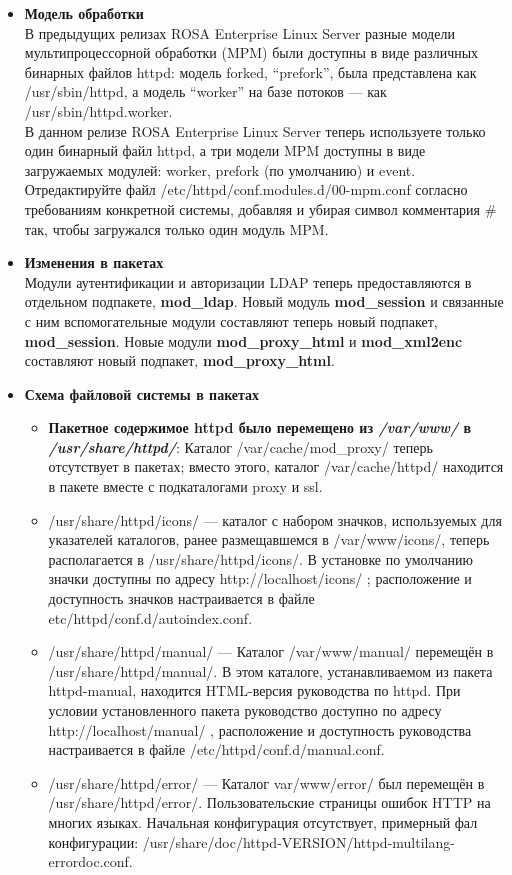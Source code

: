\documentclass[a4paper,10pt,twoside]{article}
\begin{document}
\begin{itemize}
\item \textbf{Модель обработки}\\
В предыдущих релизах ROSA Enterprise Linux Server разные модели мультипроцессорной обработки (MPM) были доступны в виде различных бинарных файлов httpd: модель forked, “prefork”, была представлена как /usr/sbin/httpd, а модель “worker” на базе потоков — как /usr/sbin/httpd.worker.\\
В данном релизе ROSA Enterprise Linux Server теперь используете только один бинарный файл httpd, а три модели MPM доступны в виде загружаемых модулей: worker, prefork (по умолчанию) и event. Отредактируйте файл /etc/httpd/conf.modules.d/00-mpm.conf согласно требованиям конкретной системы, добавляя и убирая символ комментария \# так, чтобы загружался только один модуль MPM.
\item \textbf{Изменения в пакетах}\\
Модули аутентификации и авторизации LDAP теперь предоставляются в отдельном подпакете, \textbf{mod\_ldap}. Новый модуль \textbf{mod\_session} и связанные с ним вспомогательные модули составляют теперь новый подпакет, \textbf{mod\_session}. Новые модули \textbf{mod\_proxy\_html} и \textbf{mod\_xml2enc} составляют новый подпакет, \textbf{mod\_proxy\_html}. 
\item \textbf{Схема файловой системы в пакетах}\\
\begin{itemize}
\item \textbf{Пакетное содержимое httpd было перемещено из \textit{/var/www/} в \textit{/usr/share/httpd/}}:
Каталог /var/cache/mod\_proxy/ теперь отсутствует в пакетах; вместо этого, каталог  /var/cache/httpd/ находится в пакете вместе с подкаталогами proxy и ssl.
 \item /usr/share/httpd/icons/ — каталог с набором значков, используемых для указателей каталогов, ранее размещавшемся в /var/www/icons/, теперь располагается в /usr/share/httpd/icons/. В установке по умолчанию значки доступны по адресу http://localhost/icons/ ; расположение и доступность значков настраивается в файле etc/httpd/conf.d/autoindex.conf.
\item /usr/share/httpd/manual/ — Каталог /var/www/manual/ перемещён в /usr/share/httpd/manual/. В этом каталоге, устанавливаемом из пакета httpd-manual, находится HTML-версия руководства по httpd. При условии установленного пакета руководство доступно по адресу http://localhost/manual/ , расположение и доступность руководства настраивается в файле /etc/httpd/conf.d/manual.conf.
\item /usr/share/httpd/error/ — Каталог var/www/error/ был перемещён в /usr/share/httpd/error/. Пользовательские страницы ошибок HTTP на многих языках. Начальная конфигурация отсутствует, примерный фал конфигурации: /usr/share/doc/httpd-VERSION/httpd-multilang-errordoc.conf.

\end{itemize}
\end{itemize}
\end{document}
